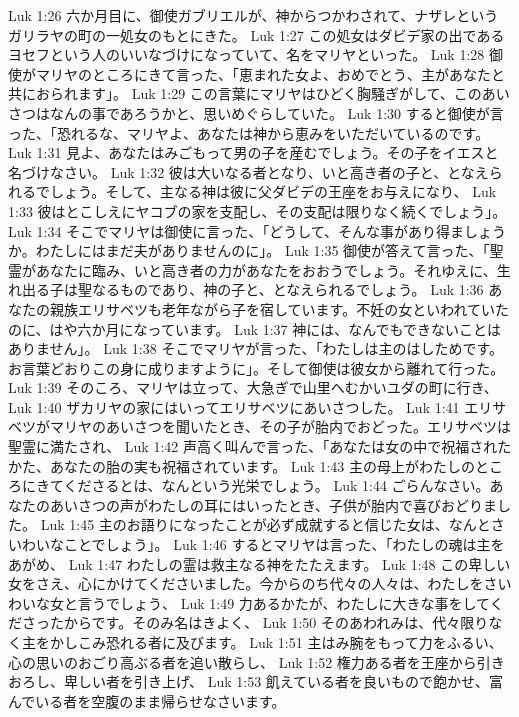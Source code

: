 Luk 1:26  六か月目に、御使ガブリエルが、神からつかわされて、ナザレというガリラヤの町の一処女のもとにきた。
Luk 1:27  この処女はダビデ家の出であるヨセフという人のいいなづけになっていて、名をマリヤといった。
Luk 1:28  御使がマリヤのところにきて言った、「恵まれた女よ、おめでとう、主があなたと共におられます」。
Luk 1:29  この言葉にマリヤはひどく胸騒ぎがして、このあいさつはなんの事であろうかと、思いめぐらしていた。
Luk 1:30  すると御使が言った、「恐れるな、マリヤよ、あなたは神から恵みをいただいているのです。
Luk 1:31  見よ、あなたはみごもって男の子を産むでしょう。その子をイエスと名づけなさい。
Luk 1:32  彼は大いなる者となり、いと高き者の子と、となえられるでしょう。そして、主なる神は彼に父ダビデの王座をお与えになり、
Luk 1:33  彼はとこしえにヤコブの家を支配し、その支配は限りなく続くでしょう」。
Luk 1:34  そこでマリヤは御使に言った、「どうして、そんな事があり得ましょうか。わたしにはまだ夫がありませんのに」。
Luk 1:35  御使が答えて言った、「聖霊があなたに臨み、いと高き者の力があなたをおおうでしょう。それゆえに、生れ出る子は聖なるものであり、神の子と、となえられるでしょう。
Luk 1:36  あなたの親族エリサベツも老年ながら子を宿しています。不妊の女といわれていたのに、はや六か月になっています。
Luk 1:37  神には、なんでもできないことはありません」。
Luk 1:38  そこでマリヤが言った、「わたしは主のはしためです。お言葉どおりこの身に成りますように」。そして御使は彼女から離れて行った。
Luk 1:39  そのころ、マリヤは立って、大急ぎで山里へむかいユダの町に行き、
Luk 1:40  ザカリヤの家にはいってエリサベツにあいさつした。
Luk 1:41  エリサベツがマリヤのあいさつを聞いたとき、その子が胎内でおどった。エリサベツは聖霊に満たされ、
Luk 1:42  声高く叫んで言った、「あなたは女の中で祝福されたかた、あなたの胎の実も祝福されています。
Luk 1:43  主の母上がわたしのところにきてくださるとは、なんという光栄でしょう。
Luk 1:44  ごらんなさい。あなたのあいさつの声がわたしの耳にはいったとき、子供が胎内で喜びおどりました。
Luk 1:45  主のお語りになったことが必ず成就すると信じた女は、なんとさいわいなことでしょう」。
Luk 1:46  するとマリヤは言った、「わたしの魂は主をあがめ、
Luk 1:47  わたしの霊は救主なる神をたたえます。
Luk 1:48  この卑しい女をさえ、心にかけてくださいました。今からのち代々の人々は、わたしをさいわいな女と言うでしょう、
Luk 1:49  力あるかたが、わたしに大きな事をしてくださったからです。そのみ名はきよく、
Luk 1:50  そのあわれみは、代々限りなく主をかしこみ恐れる者に及びます。
Luk 1:51  主はみ腕をもって力をふるい、心の思いのおごり高ぶる者を追い散らし、
Luk 1:52  権力ある者を王座から引きおろし、卑しい者を引き上げ、
Luk 1:53  飢えている者を良いもので飽かせ、富んでいる者を空腹のまま帰らせなさいます。
